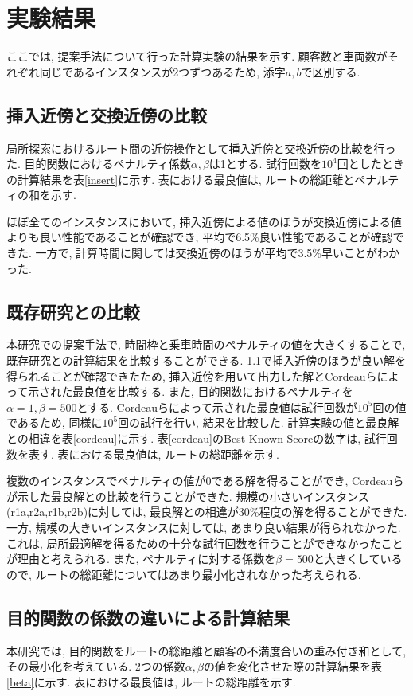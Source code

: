 \section{実験結果}
ここでは, 提案手法について行った計算実験の結果を示す.
顧客数と車両数がそれぞれ同じであるインスタンスが2つずつあるため, 添字$a,b$で区別する.

\subsection{挿入近傍と交換近傍の比較}
\label{sec:insert}
局所探索におけるルート間の近傍操作として挿入近傍と交換近傍の比較を行った.
目的関数におけるペナルティ係数$\alpha,\beta$は1とする.
試行回数を$10^4$回としたときの計算結果を表\ref{insert}に示す.
表における最良値は, ルートの総距離とペナルティの和を示す.


ほぼ全てのインスタンスにおいて, 挿入近傍による値のほうが交換近傍による値よりも良い性能であることが確認でき, 平均で6.5\%良い性能であることが確認できた. 一方で, 計算時間に関しては交換近傍のほうが平均で3.5\%早いことがわかった.
\subsection{既存研究との比較}
\label{sec:cordeau}
本研究での提案手法で, 時間枠と乗車時間のペナルティの値を大きくすることで, 既存研究との計算結果を比較することができる. \ref{sec:insert}で挿入近傍のほうが良い解を得られることが確認できたため, 挿入近傍を用いて出力した解とCordeauらによって示された最良値を比較する. また, 目的関数におけるペナルティを$\alpha=1,\beta=500$とする.
Cordeauらによって示された最良値は試行回数が$10^5$回の値であるため, 同様に$10^5$回の試行を行い, 結果を比較した. 計算実験の値と最良解との相違を表\ref{cordeau}に示す. 表\ref{cordeau}のBest Known Scoreの数字は, 試行回数を表す. 表における最良値は, ルートの総距離を示す.

複数のインスタンスでペナルティの値が0である解を得ることができ, Cordeauらが示した最良解との比較を行うことができた.
規模の小さいインスタンス(r1a,r2a,r1b,r2b)に対しては, 最良解との相違が30\%程度の解を得ることができた. 一方, 規模の大きいインスタンスに対しては, あまり良い結果が得られなかった. これは, 局所最適解を得るための十分な試行回数を行うことができなかったことが理由と考えられる. また, ペナルティに対する係数を$\beta=500$と大きくしているので, ルートの総距離についてはあまり最小化されなかった考えられる.
\subsection{目的関数の係数の違いによる計算結果}
本研究では, 目的関数をルートの総距離と顧客の不満度合いの重み付き和として, その最小化を考えている. 2つの係数$\alpha,\beta$の値を変化させた際の計算結果を表\ref{beta}に示す. 表における最良値は, ルートの総距離を示す.

